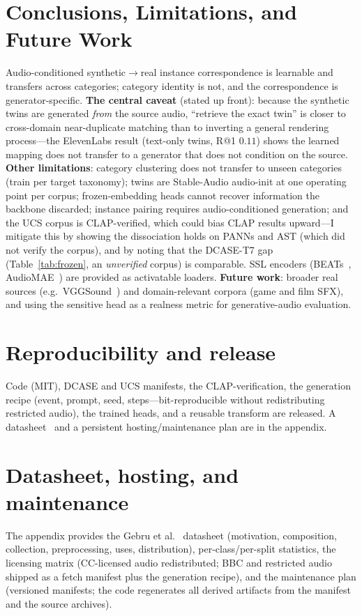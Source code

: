\documentclass{article}
\begin{document}
\section{Conclusions, Limitations, and Future Work}
Audio-conditioned synthetic$\to$real instance correspondence is learnable and transfers across
categories; category identity is not, and the correspondence is generator-specific. \textbf{The
central caveat} (stated up front): because the synthetic twins are generated \emph{from} the source
audio, ``retrieve the exact twin'' is closer to cross-domain near-duplicate matching than to
inverting a general rendering process---the ElevenLabs result (text-only twins, R@1 $0.11$) shows
the learned mapping does not transfer to a generator that does not condition on the source.
\textbf{Other limitations}: category clustering does not transfer to unseen categories
(train per target taxonomy); twins are Stable-Audio audio-init at one operating point per corpus;
frozen-embedding heads cannot recover information the backbone discarded; instance pairing requires
audio-conditioned generation; and the UCS corpus is CLAP-verified, which could bias CLAP results
upward---I mitigate this by showing the dissociation holds on PANNs and AST (which did not verify
the corpus), and by noting that the DCASE-T7 gap (Table~\ref{tab:frozen}, an \emph{unverified}
corpus) is comparable. SSL encoders
(BEATs~\citep{chen2023beats}, AudioMAE~\citep{huang2022audiomae}) are provided as activatable loaders. \textbf{Future work}: broader real sources (e.g.\
VGGSound~\citep{chen2020vggsound}) and domain-relevant corpora (game and film SFX), and using the
sensitive head as a realness metric for generative-audio evaluation.

\section*{Reproducibility and release}
Code (MIT), DCASE and UCS manifests, the CLAP-verification, the generation recipe (event, prompt,
seed, steps---bit-reproducible without redistributing restricted audio), the trained heads, and a
reusable transform are released. A datasheet~\citep{gebru2021datasheets} and a persistent
hosting/maintenance plan are in the appendix.




\appendix
\section{Datasheet, hosting, and maintenance}
The appendix provides the Gebru et al.~\citep{gebru2021datasheets} datasheet (motivation,
composition, collection, preprocessing, uses, distribution), per-class/per-split statistics, the
licensing matrix (CC-licensed audio redistributed; BBC and restricted audio shipped as a fetch
manifest plus the generation recipe), and the maintenance plan (versioned manifests; the code
regenerates all derived artifacts from the manifest and the source archives).
\end{document}
